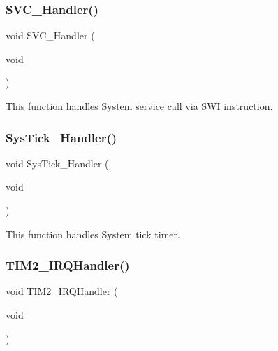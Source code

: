 \mbox{\label{stm32f3xx__it_8c_a3e5ddb3df0d62f2dc357e64a3f04a6ce}} 
\subsubsection{S\+V\+C\+\_\+\+Handler()}
{\footnotesize\ttfamily void S\+V\+C\+\_\+\+Handler (\begin{DoxyParamCaption}\item[{void}]{ }\end{DoxyParamCaption})}



This function handles System service call via S\+WI instruction. 

\mbox{\label{stm32f3xx__it_8c_ab5e09814056d617c521549e542639b7e}} 
\subsubsection{Sys\+Tick\+\_\+\+Handler()}
{\footnotesize\ttfamily void Sys\+Tick\+\_\+\+Handler (\begin{DoxyParamCaption}\item[{void}]{ }\end{DoxyParamCaption})}



This function handles System tick timer. 

\mbox{\label{stm32f3xx__it_8c_a38ad4725462bdc5e86c4ead4f04b9fc2}} 
\subsubsection{T\+I\+M2\+\_\+\+I\+R\+Q\+Handler()}
{\footnotesize\ttfamily void T\+I\+M2\+\_\+\+I\+R\+Q\+Handler (\begin{DoxyParamCaption}\item[{void}]{ }\end{DoxyParamCaption})}



